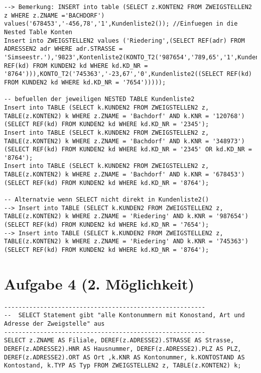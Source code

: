 \documentclass{scrartcl}
\begin{document}
\begin{landscape}
\begin{lstlisting}
--> Bemerkung: INSERT into table (SELECT z.KONTEN2 FROM ZWEIGSTELLEN2 z WHERE z.ZNAME ='BACHDORF') values('678453','-456,78','1',Kundenliste2()); //Einfuegen in die Nested Table Konten
Insert into ZWEIGSTELLEN2 values ('Riedering',(SELECT REF(adr) FROM ADRESSEN2 adr WHERE adr.STRASSE = 'Simseestr.'),'9823',Kontenliste2(KONTO_T2('987654','789,65','1',Kundenliste2((SELECT REF(kd) FROM KUNDEN2 kd WHERE kd.KD_NR = '8764'))),KONTO_T2('745363','-23,67','0',Kundenliste2((SELECT REF(kd) FROM KUNDEN2 kd WHERE kd.KD_NR = '7654')))));

-- befuellen der jeweiligen NESTED TABLE Kundenliste2
Insert into TABLE (SELECT k.KUNDEN2 FROM ZWEIGSTELLEN2 z, TABLE(z.KONTEN2) k WHERE z.ZNAME = 'Bachdorf' AND k.KNR = '120768')(SELECT REF(kd) FROM KUNDEN2 kd WHERE kd.KD_NR = '2345');
Insert into TABLE (SELECT k.KUNDEN2 FROM ZWEIGSTELLEN2 z, TABLE(z.KONTEN2) k WHERE z.ZNAME = 'Bachdorf' AND k.KNR = '348973')(SELECT REF(kd) FROM KUNDEN2 kd WHERE kd.KD_NR = '2345' OR kd.KD_NR = '8764');
Insert into TABLE (SELECT k.KUNDEN2 FROM ZWEIGSTELLEN2 z, TABLE(z.KONTEN2) k WHERE z.ZNAME = 'Bachdorf' AND k.KNR = '678453')(SELECT REF(kd) FROM KUNDEN2 kd WHERE kd.KD_NR = '8764');

-- Alternatvie wenn SELECT nicht direkt in Kundenliste2()
--> Insert into TABLE (SELECT k.KUNDEN2 FROM ZWEIGSTELLEN2 z, TABLE(z.KONTEN2) k WHERE z.ZNAME = 'Riedering' AND k.KNR = '987654')(SELECT REF(kd) FROM KUNDEN2 kd WHERE kd.KD_NR = '7654');
--> Insert into TABLE (SELECT k.KUNDEN2 FROM ZWEIGSTELLEN2 z, TABLE(z.KONTEN2) k WHERE z.ZNAME = 'Riedering' AND k.KNR = '745363')(SELECT REF(kd) FROM KUNDEN2 kd WHERE kd.KD_NR = '8764');

\end{lstlisting}
\section*{Aufgabe 4 (2. Möglichkeit)}
\begin{lstlisting}
--------------------------------------------------------
--  SELECT Statement gibt "alle Kontonummern mit Konostand, Art und Adresse der Zweigstelle" aus
--------------------------------------------------------
SELECT z.ZNAME AS Filiale, DEREF(z.ADRESSE2).STRASSE AS Strasse, DEREF(z.ADRESSE2).HNR AS Hausnummer, DEREF(z.ADRESSE2).PLZ AS PLZ, DEREF(z.ADRESSE2).ORT AS Ort ,k.KNR AS Kontonummer, k.KONTOSTAND AS Kontostand, k.TYP AS Typ FROM ZWEIGSTELLEN2 z, TABLE(z.KONTEN2) k;


\end{lstlisting}
\end{landscape}
\end{document}
